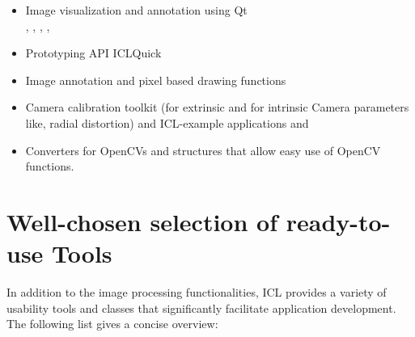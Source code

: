 \begin{itemize}
\item Image visualization and annotation using Qt\\
, , , ,

\item Prototyping API ICLQuick\\

\item Image annotation and pixel based drawing functions\\

\item Camera calibration toolkit (for extrinsic and for intrinsic Camera parameters like, radial distortion)
 and ICL-example applications  and 

\item Converters for OpenCVs  and  structures that allow easy use of OpenCV functions.\\
\end{itemize}



\section{Well-chosen selection of ready-to-use Tools}
In addition to the image processing functionalities, ICL provides a variety of usability tools and classes that significantly facilitate application development. The following list gives a concise overview:

